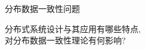 \begin{frame}{分布数据一致性问题}

  \pause
  \vspace{0.80cm}

  \begin{center}
	分布式系统设计与其应用有哪些特点,\\对分布数据一致性理论有何影响?
  \end{center}

\end{frame}
